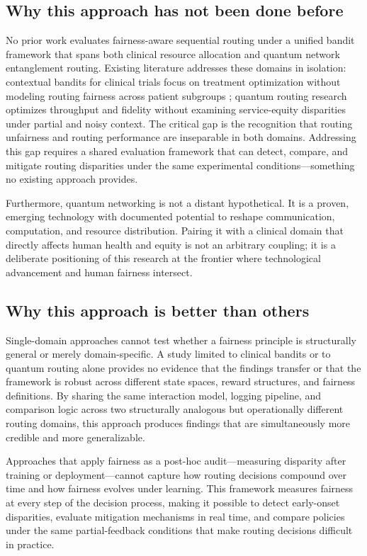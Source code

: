 \documentclass{IEEEtran}
\begin{document}
\subsection{Why this approach has not been done before}
No prior work evaluates fairness-aware sequential routing under a unified
bandit framework that spans both clinical resource allocation and quantum
network entanglement routing. Existing literature addresses these domains in
isolation: contextual bandits for clinical trials focus on treatment
optimization without modeling routing fairness across patient subgroups
\cite{garcia2025equitable_bioinformatics}; quantum routing research
optimizes throughput and fidelity without examining service-equity
disparities under partial and noisy context. The critical gap is the
recognition that routing unfairness and routing performance are inseparable
in both domains. Addressing this gap requires a shared evaluation framework
that can detect, compare, and mitigate routing disparities under the same
experimental conditions---something no existing approach provides.

Furthermore, quantum networking is not a distant hypothetical. It is a
proven, emerging technology with documented potential to reshape
communication, computation, and resource distribution. Pairing it with a
clinical domain that directly affects human health and equity is not an
arbitrary coupling; it is a deliberate positioning of this research at the
frontier where technological advancement and human fairness intersect.

\subsection{Why this approach is better than others}
Single-domain approaches cannot test whether a fairness principle is
structurally general or merely domain-specific. A study limited to clinical
bandits or to quantum routing alone provides no evidence that the findings
transfer or that the framework is robust across different state spaces,
reward structures, and fairness definitions. By sharing the same interaction
model, logging pipeline, and comparison logic across two structurally
analogous but operationally different routing domains, this approach produces
findings that are simultaneously more credible and more generalizable.

Approaches that apply fairness as a post-hoc audit---measuring disparity
after training or deployment---cannot capture how routing decisions compound
over time and how fairness evolves under learning. This framework measures
fairness at every step of the decision process, making it possible to detect
early-onset disparities, evaluate mitigation mechanisms in real time, and
compare policies under the same partial-feedback conditions that make routing
decisions difficult in practice.
\end{document}
